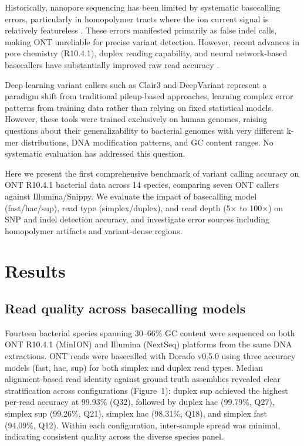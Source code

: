 \documentclass[11pt]{article}
\begin{document}
Historically, nanopore sequencing has been limited by systematic basecalling errors, particularly in homopolymer tracts where the ion current signal is relatively featureless \citep{rang2018squiggly}. These errors manifested primarily as false indel calls, making ONT unreliable for precise variant detection. However, recent advances in pore chemistry (R10.4.1), duplex reading capability, and neural network-based basecallers have substantially improved raw read accuracy \citep{loman2023nanopore}.

Deep learning variant callers such as Clair3 \citep{zheng2022haplotype} and DeepVariant \citep{poplin2018universal} represent a paradigm shift from traditional pileup-based approaches, learning complex error patterns from training data rather than relying on fixed statistical models. However, these tools were trained exclusively on human genomes, raising questions about their generalizability to bacterial genomes with very different k-mer distributions, DNA modification patterns, and GC content ranges. No systematic evaluation has addressed this question.

Here we present the first comprehensive benchmark of variant calling accuracy on ONT R10.4.1 bacterial data across 14 species, comparing seven ONT callers against Illumina/Snippy. We evaluate the impact of basecalling model (fast/hac/sup), read type (simplex/duplex), and read depth (5$\times$ to 100$\times$) on SNP and indel detection accuracy, and investigate error sources including homopolymer artifacts and variant-dense regions.

\section{Results}

\subsection{Read quality across basecalling models}

Fourteen bacterial species spanning 30--66\% GC content were sequenced on both ONT R10.4.1 (MinION) and Illumina (NextSeq) platforms from the same DNA extractions. ONT reads were basecalled with Dorado v0.5.0 using three accuracy models (fast, hac, sup) for both simplex and duplex read types. Median alignment-based read identity against ground truth assemblies revealed clear stratification across configurations (Figure~1): duplex sup achieved the highest per-read accuracy at 99.93\% (Q32), followed by duplex hac (99.79\%, Q27), simplex sup (99.26\%, Q21), simplex hac (98.31\%, Q18), and simplex fast (94.09\%, Q12). Within each configuration, inter-sample spread was minimal, indicating consistent quality across the diverse species panel.
\end{document}
